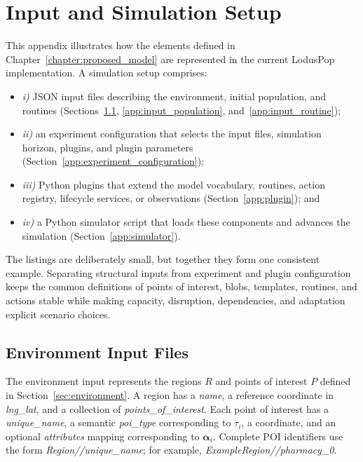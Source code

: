 \chapter{Input and Simulation Setup}
\label{app:input}

This appendix illustrates how the elements defined in
Chapter~\ref{chapter:proposed_model} are represented in the current LodusPop
implementation. A simulation setup comprises:
\begin{itemize}
    \item \textit{i)} JSON input files describing the environment, initial
    population, and routines (Sections~\ref{app:input_environment},
    \ref{app:input_population}, and~\ref{app:input_routine});
    \item \textit{ii)} an experiment configuration that selects the input
    files, simulation horizon, plugins, and plugin parameters
    (Section~\ref{app:experiment_configuration});
    \item \textit{iii)} Python plugins that extend the model vocabulary,
    routines, action registry, lifecycle services, or observations
    (Section~\ref{app:plugin}); and
    \item \textit{iv)} a Python simulator script that loads these components
    and advances the simulation (Section~\ref{app:simulator}).
\end{itemize}

The listings are deliberately small, but together they form one consistent
example. Separating structural inputs from experiment and plugin configuration
keeps the common definitions of points of interest, blobs, templates, routines,
and actions stable while making capacity, disruption, dependencies, and
adaptation explicit scenario choices.


\section{Environment Input Files}
\label{app:input_environment}

The environment input represents the regions $R$ and points of interest $P$
defined in Section~\ref{sec:environment}. A region has a \textit{name}, a
reference coordinate in \textit{lng\_lat}, and a collection of
\textit{points\_of\_interest}. Each point of interest has a
\textit{unique\_name}, a semantic \textit{poi\_type} corresponding to
$\tau_i$, a coordinate, and an optional \textit{attributes} mapping
corresponding to $\bm{\alpha}_i$. Complete POI identifiers use the form
\textit{Region//unique\_name}; for example,
\textit{ExampleRegion//pharmacy\_0}.

